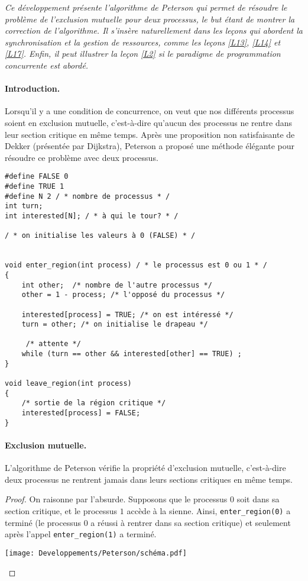 
\textit{Ce développement présente l'algorithme de Peterson qui permet de résoudre le problème de l'exclusion mutuelle pour deux processus, le but étant de montrer la correction de l'algorithme. Il s'insère naturellement dans les leçons qui abordent la synchronisation et la gestion de ressources, comme les leçons \ref{L13}, \ref{L14} et \ref{L17}. Enfin, il peut illustrer la leçon \ref{L2} si le paradigme de programmation concurrente est abordé.}


\paragraph{Introduction.} Lorsqu'il y a une condition de concurrence, on veut que nos différents processus soient en exclusion mutuelle, c'est-à-dire qu'aucun des processus ne rentre dans leur section critique en même temps. Après une proposition non satisfaisante de Dekker (présentée par Dijkstra), Peterson a proposé une méthode élégante pour résoudre ce problème avec deux processus.


\begin{lstlisting}
#define FALSE 0
#define TRUE 1
#define N 2 / * nombre de processus * /
int turn;
int interested[N]; / * à qui le tour? * /

/ * on initialise les valeurs à 0 (FALSE) * /


void enter_region(int process) / * le processus est 0 ou 1 * /
{
	int other;  /* nombre de l'autre processus */
	other = 1 - process; /* l'opposé du processus */

	interested[process] = TRUE; /* on est intéressé */
	turn = other; /* on initialise le drapeau */

	 /* attente */
	while (turn == other && interested[other] == TRUE) ;
}

void leave_region(int process) 
{
	/* sortie de la région critique */	
	interested[process] = FALSE; 
}
\end{lstlisting}


\paragraph{Exclusion mutuelle.} 

\begin{proposition}
L'algorithme de Peterson vérifie la propriété d'exclusion mutuelle, c'est-à-dire deux processus ne rentrent jamais dans leurs sections critiques en même temps.
\end{proposition}
\begin{proof}
On raisonne par l'absurde. Supposons que le processus $0$ soit dans sa section critique, et le processus $1$ accède à la sienne. Ainsi, \texttt{enter\_region(0)} a terminé (le processus $0$ a réussi à rentrer dans sa section critique) et seulement après l'appel \texttt{enter\_region(1)} a terminé.

\begin{center}
\texttt{[image: Developpements/Peterson/schéma.pdf]} 
\end{center}

\end{proof}

